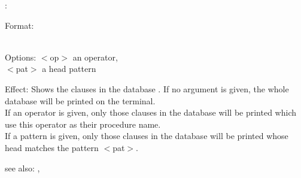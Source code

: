 \listing:

Format: \\
        \\

Options: $<$op$>$ an operator,\\
         $<$pat$>$ a head pattern

Effect: Shows the clauses in the database .
        If no argument is given, the whole database will be printed on
	the terminal.\\
	If an operator is given, only those clauses in the database will
	be printed which use this operator as their procedure name.\\
	If a pattern is given, only those clauses in the database will
	be printed whose head matches the pattern $<$pat$>$.

see also: \consult, \lL
